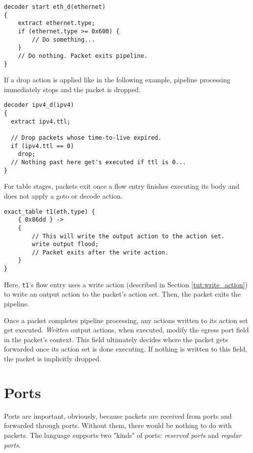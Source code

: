 \begin{codepage}
\begin{lstlisting}
decoder start eth_d(ethernet)
{
	extract ethernet.type;
	if (ethernet.type >= 0x600) {
		// Do something...
	}
	// Do nothing. Packet exits pipeline.
}
\end{lstlisting}
\end{codepage}

If a drop action is applied like in the following example, pipeline processing
immediately stops and the packet is dropped.

\begin{codepage}
\begin{lstlisting}
decoder ipv4_d(ipv4)
{
  extract ipv4.ttl;

  // Drop packets whose time-to-live expired.
  if (ipv4.ttl == 0)
  	drop;
  // Nothing past here get's executed if ttl is 0...
}
\end{lstlisting}
\end{codepage}

For table stages, packets exit once a flow entry finishes executing its body and
does not apply a goto or decode action.

\begin{codepage}
\begin{lstlisting}
exact_table t1(eth.type) {
	{ 0x86dd } ->
	{
		// This will write the output action to the action set.
		write output flood;
		// Packet exits after the write action.
	}
}
\end{lstlisting}
\end{codepage}

Here, \texttt{t1}'s flow entry uses a write action (described in Section
\ref{tut:write_action}) to write an output action to the packet's action set.
Then, the packet exits the pipeline.

Once a packet completes pipeline processing, any actions written to its action
set get executed. \textit{Written} output actions, when executed, modify the
egress port field in the packet's context. This field ultimately decides where
the packet gets forwarded once its action set is done executing. If nothing is
written to this field, the packet is implicitly dropped.

\section{Ports} \label{tut:ports}

Ports are important, obviously, because packets are received from ports and
forwarded through ports. Without them, there would be nothing to do with
packets. The language supports two "kinds" of ports: \textit{reserved ports} and
\textit{regular ports}.

